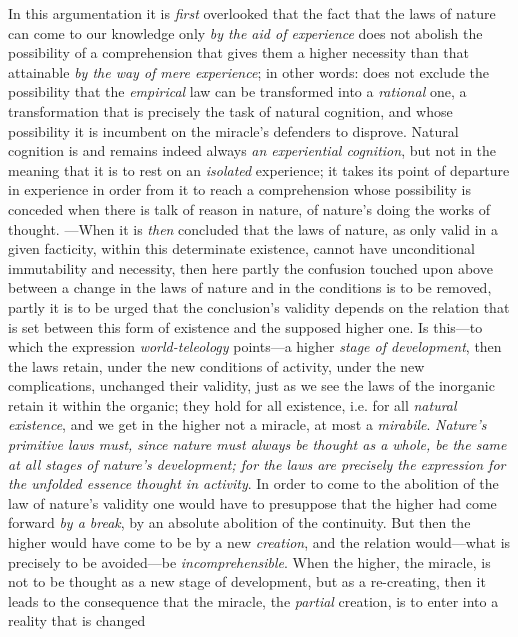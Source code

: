 \documentclass[12pt,a4paper]{book}
\begin{document}
In this argumentation it is \emph{first} overlooked that the fact that the laws of
nature can come to our knowledge only \emph{by the aid of experience} does not abolish the
possibility of a comprehension that gives them a higher necessity than that attainable
\emph{by the way of mere experience}; in other words: does not exclude the possibility that
the \emph{empirical} law can be transformed into a \emph{rational} one, a transformation that is precisely
the task of natural cognition, and whose possibility it is incumbent on the miracle's
defenders to disprove. Natural cognition is and remains indeed always \emph{an experiential
cognition}, but not in the meaning that it is to rest on an \emph{isolated} experience; it
takes its point of departure in experience in order from it to reach a comprehension whose
possibility is conceded when there is talk of reason in nature, of nature's doing the works
of thought. ---When it is \emph{then} concluded that the laws of nature, as only valid in a given
facticity, within this determinate existence, cannot have unconditional immutability and
necessity, then here partly the confusion touched upon above between a change in the laws of
nature and in the conditions is to be removed, partly it is to be urged that the conclusion's
validity depends on the relation that is set between this form of existence and the supposed
higher one. Is this---to which the expression \emph{world-teleology} points---a higher
\emph{stage of development}, then the laws retain, under the new conditions of activity, under the
new complications, unchanged their validity, just as we see the laws of the inorganic retain
it within the organic; they hold for all existence, i.e. for all \emph{natural existence}, and we
get in the higher not a miracle, at most a \textit{mirabile}. \emph{Nature's primitive laws
must, since nature must always be thought as a whole, be the same at all stages of nature's
development; for the laws are precisely the expression for the unfolded essence thought in
activity}. In order to come to the abolition of the law of nature's validity one would have
to presuppose that the higher had come forward \emph{by a break}, by an absolute abolition of the
continuity. But then the higher would have come to be by a new \emph{creation}, and the relation
would---what is precisely to be avoided---be \emph{incomprehensible}. When the higher, the miracle,
is not to be thought as a new stage of development, but as a re-creating, then it leads to the
consequence that the miracle, the \emph{partial} creation, is to enter into a reality that is changed
\end{document}
